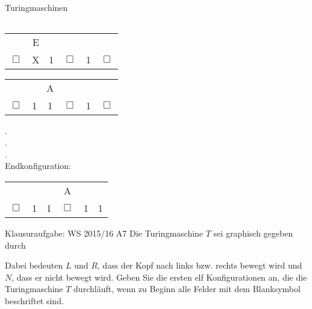 \begin{frame}{Turingmaschinen}
\begin{minipage}[t!]{0.5\textwidth}
\begin{center}
\begin{tabular}{cccccc}
      \end{tabular}
    \end{center}
  \end{minipage}
  \begin{minipage}[t!]{0.4\textwidth}
    \begin{center}
      \begin{tabular}{cccccc}
        & E & & & & \\
        $\Box$ & X & 1 & $\Box$ & 1 & $\Box$ \\
      \end{tabular}
      \begin{tabular}{cccccc}
        & & A & & & \\
        $\Box$ & 1 & 1 & $\Box$ & 1 & $\Box$ \\
      \end{tabular}
      .\\
      .\\
      .\\
      Endkonfiguration: 
      \begin{tabular}{cccccc}
        & & & A & & \\
        $\Box$ & 1 & 1 & $\Box$ & 1 & 1 \\
      \end{tabular}
    \end{center}
  \end{minipage}
\end{frame}

\begin{frame}{Klausuraufgabe: WS 2015/16 A7}
  Die Turingmaschine $T$ sei graphisch gegeben durch
  \begin{center}
  \end{center}
  Dabei bedeuten $L$ und $R$, dass der Kopf nach links bzw. rechts bewegt wird und $N$, dass er nicht bewegt wird.
  Geben Sie die ersten elf Konfigurationen an, die die Turingmaschine $T$ durchläuft, wenn zu Beginn alle Felder mit dem Blanksymbol beschriftet sind.
\end{frame}

